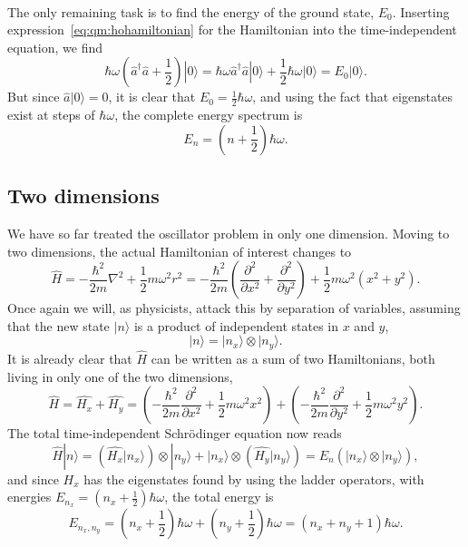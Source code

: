 \paragraph*{}
The only remaining task is to find the energy of the ground state, $E_0$.
Inserting expression~\eqref{eq:qm:hohamiltonian} for the Hamiltonian into the time-independent equation, we find
\begin{equation}
\hbar\omega \left( \hat{a}^{\dagger}\hat{a} + \frac{1}{2} \right) | 0 \rangle
= \hbar\omega  \hat{a}^{\dagger}\hat{a} |0\rangle + \frac{1}{2}\hbar\omega | 0 \rangle = E_0 |0\rangle .
\end{equation}
But since $\hat{a}|0\rangle = 0$, it is clear that $E_0 = \frac{1}{2}\hbar\omega$, and using the fact that eigenstates exist at steps of $\hbar \omega$, the complete energy spectrum is 
\begin{equation}
E_n = \left( n + \frac{1}{2} \right) \hbar \omega .
\end{equation}



\subsection{Two dimensions}
\label{sec:qm:ho2d}
We have so far treated the oscillator problem in only one dimension.
Moving to two dimensions, the actual Hamiltonian of interest changes to
\begin{equation}
\hat{H}
= -\frac{\hbar^2}{2m}\nabla^2 + \frac{1}{2} m \omega^2 r^2  
= -\frac{\hbar^2}{2m}\left(\frac{\partial^2}{\partial x^2} +\frac{\partial^2}{\partial y^2} \right) + \frac{1}{2} m \omega^2 \left(x^2 + y^2\right) .
\end{equation}
Once again we will, as physicists, attack this by separation of variables, assuming that the new state $|n\rangle$ is a product of independent states in $x$ and $y$,
\begin{equation}
|n\rangle = |n_x \rangle \otimes |n_y \rangle .
\end{equation}
It is already clear that $\hat{H}$ can be written as a sum of two Hamiltonians, both living in only one of the two dimensions,
\begin{equation}
\hat{H} = \hat{H_x} + \hat{H_y} 
= \left(-\frac{\hbar^2}{2m}\frac{\partial^2}{\partial x^2} + \frac{1}{2} m \omega^2 x^2\right) + \left(-\frac{\hbar^2}{2m}\frac{\partial^2}{\partial y^2}  + \frac{1}{2} m \omega^2 y^2\right) .
\end{equation}
The total time-independent Schrödinger equation now reads
\begin{equation}
\hat{H}|n\rangle = \left(\hat{H_x}|n_x \rangle \right) \otimes |n_y \rangle + |n_x \rangle \otimes \left( \hat{H_y} |n_y \rangle \right)
= E_n \left( |n_x \rangle \otimes |n_y \rangle \right),
\end{equation}
and since $H_x$ has the eigenstates found by using the ladder operators, with energies $E_{n_x} = \left(n_x + \frac{1}{2} \right) \hbar\omega$, the total energy is
\begin{equation}
E_{n_x,n_y} 
= \left(n_x + \frac{1}{2}\right) \hbar \omega + \left(n_y + \frac{1}{2}\right) \hbar \omega
= \left(n_x + n_y + 1\right) \hbar \omega .
\end{equation}


